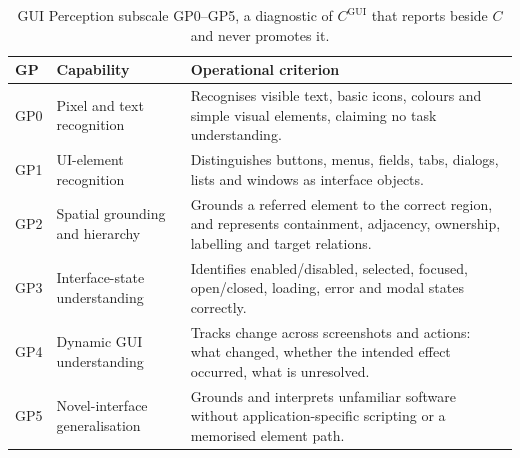 \begin{table}[!htbp]
\centering\small
\begin{tabularx}{\textwidth}{@{}llY@{}}
\toprule
GP & Capability & Operational criterion \\
\midrule
GP0 & Pixel and text recognition & Recognises visible text, basic icons, colours and simple visual elements, claiming no task understanding. \\
GP1 & UI-element recognition & Distinguishes buttons, menus, fields, tabs, dialogs, lists and windows as interface objects. \\
GP2 & Spatial grounding and hierarchy & Grounds a referred element to the correct region, and represents containment, adjacency, ownership, labelling and target relations. \\
GP3 & Interface-state understanding & Identifies enabled/disabled, selected, focused, open/closed, loading, error and modal states correctly. \\
GP4 & Dynamic GUI understanding & Tracks change across screenshots and actions: what changed, whether the intended effect occurred, what is unresolved. \\
GP5 & Novel-interface generalisation & Grounds and interprets unfamiliar software without application-specific scripting or a memorised element path. \\
\bottomrule
\end{tabularx}
\caption{GUI Perception subscale GP0--GP5, a diagnostic of $C^{\mathrm{GUI}}$ that reports beside $C$ and never promotes it.}
\label{tab:gp}
\end{table}

